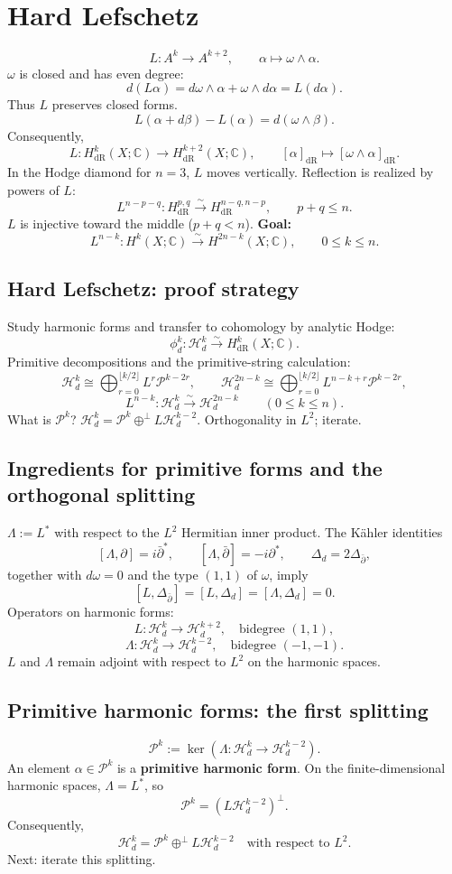 \documentclass[11pt]{article}
\newcommand{\C}{\mathbb C}
\newcommand{\Hd}{\mathcal H_d}
\newcommand{\Prim}{\mathcal P}
\newcommand{\dR}{\mathrm{dR}}
\newcommand{\bdel}{\bar\partial}
\newcommand{\orthsum}{\mathbin{\oplus^{\perp}}}
\begin{document}
\section*{Hard Lefschetz}
\[
 L:A^k\longrightarrow A^{k+2},\qquad\alpha\longmapsto\omega\wedge\alpha.
\]
$\omega$ is closed and has even degree:
\[
 d(L\alpha)=d\omega\wedge\alpha+\omega\wedge d\alpha=L(d\alpha).
\]
Thus $L$ preserves closed forms.
\[
 L(\alpha+d\beta)-L(\alpha)=d(\omega\wedge\beta).
\]
Consequently,
\[
 L:H^k_{\dR}(X;\C)\longrightarrow H^{k+2}_{\dR}(X;\C),
 \qquad[\alpha]_{\dR}\longmapsto[\omega\wedge\alpha]_{\dR}.
\]
In the Hodge diamond for $n=3$, $L$ moves vertically.
Reflection is realized by powers of $L$:
\[
 L^{n-p-q}:H^{p,q}_{\dR}\xrightarrow{\sim}H^{n-q,n-p}_{\dR},
 \qquad p+q\leq n.
\]
$L$ is injective toward the middle ($p+q<n$).
\textbf{Goal:}
\[
 L^{n-k}:H^k(X;\C)\xrightarrow{\sim}H^{2n-k}(X;\C),
 \qquad0\leq k\leq n.
\]

\subsection*{Hard Lefschetz: proof strategy}
Study harmonic forms and transfer to cohomology by analytic Hodge:
\[
 \phi_d^k:\Hd^k\xrightarrow{\sim}H^k_{\dR}(X;\C).
\]
Primitive decompositions and the primitive-string calculation:
\[
 \Hd^k\cong\bigoplus_{r=0}^{\lfloor k/2\rfloor}L^r\Prim^{k-2r},
 \qquad
 \Hd^{2n-k}\cong
 \bigoplus_{r=0}^{\lfloor k/2\rfloor}L^{n-k+r}\Prim^{k-2r},
\]
\[
 L^{n-k}:\Hd^k\xrightarrow{\sim}\Hd^{2n-k}
 \qquad(0\leq k\leq n).
\]
What is $\Prim^k$? $\Hd^k=\Prim^k\orthsum L\Hd^{k-2}$.
Orthogonality in $L^2$; iterate.

\subsection*{Ingredients for primitive forms and the orthogonal splitting}
$\Lambda:=L^*$ with respect to the $L^2$ Hermitian inner product.
The K\"ahler identities
\[
 [\Lambda,\partial]=i\bdel^*,\qquad
 [\Lambda,\bdel]=-i\partial^*,\qquad
 \Delta_d=2\Delta_{\bdel},
\]
together with $d\omega=0$ and the type $(1,1)$ of $\omega$, imply
\[
 [L,\Delta_{\bdel}]=[L,\Delta_d]=[\Lambda,\Delta_d]=0.
\]
Operators on harmonic forms:
\[
 L:\Hd^k\longrightarrow\Hd^{k+2},\quad\text{bidegree }(1,1),
\]
\[
 \Lambda:\Hd^k\longrightarrow\Hd^{k-2},\quad\text{bidegree }(-1,-1).
\]
$L$ and $\Lambda$ remain adjoint with respect to $L^2$ on the harmonic spaces.

\subsection*{Primitive harmonic forms: the first splitting}
\[
 \Prim^k:=\ker(\Lambda:\Hd^k\longrightarrow\Hd^{k-2}).
\]
An element $\alpha\in\Prim^k$ is a \textbf{primitive harmonic form}.
On the finite-dimensional harmonic spaces, $\Lambda=L^*$, so
\[
 \Prim^k=(L\Hd^{k-2})^\perp.
\]
Consequently,
\[
 \Hd^k=\Prim^k\orthsum L\Hd^{k-2}
 \quad\text{with respect to }L^2.
\]
Next: iterate this splitting.
\end{document}
